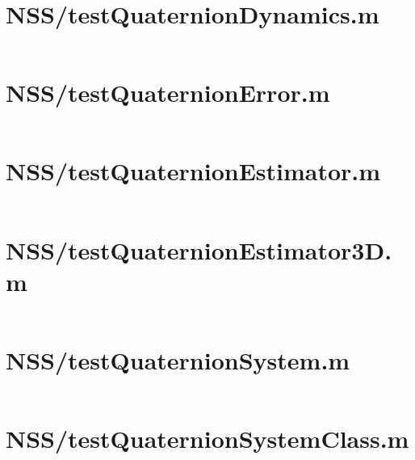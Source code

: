 \pagebreak
\section*{NSS/testQuaternionDynamics.m}\label{code:NSS/testQuaternionDynamics.m}
\inputminted[linenos,fontsize=\scriptsize]{matlab}{/home/dcouture/git/mathyourlife/TSatPy/beta_versions/matlab_object_oriented/testQuaternionDynamics.m}

\pagebreak
\section*{NSS/testQuaternionError.m}\label{code:NSS/testQuaternionError.m}
\inputminted[linenos,fontsize=\scriptsize]{matlab}{/home/dcouture/git/mathyourlife/TSatPy/beta_versions/matlab_object_oriented/testQuaternionError.m}

\pagebreak
\section*{NSS/testQuaternionEstimator.m}\label{code:NSS/testQuaternionEstimator.m}
\inputminted[linenos,fontsize=\scriptsize]{matlab}{/home/dcouture/git/mathyourlife/TSatPy/beta_versions/matlab_object_oriented/testQuaternionEstimator.m}

\pagebreak
\section*{NSS/testQuaternionEstimator3D.m}\label{code:NSS/testQuaternionEstimator3D.m}
\inputminted[linenos,fontsize=\scriptsize]{matlab}{/home/dcouture/git/mathyourlife/TSatPy/beta_versions/matlab_object_oriented/testQuaternionEstimator3D.m}

\pagebreak
\section*{NSS/testQuaternionSystem.m}\label{code:NSS/testQuaternionSystem.m}
\inputminted[linenos,fontsize=\scriptsize]{matlab}{/home/dcouture/git/mathyourlife/TSatPy/beta_versions/matlab_object_oriented/testQuaternionSystem.m}

\pagebreak
\section*{NSS/testQuaternionSystemClass.m}\label{code:NSS/testQuaternionSystemClass.m}
\inputminted[linenos,fontsize=\scriptsize]{matlab}{/home/dcouture/git/mathyourlife/TSatPy/beta_versions/matlab_object_oriented/testQuaternionSystemClass.m}

